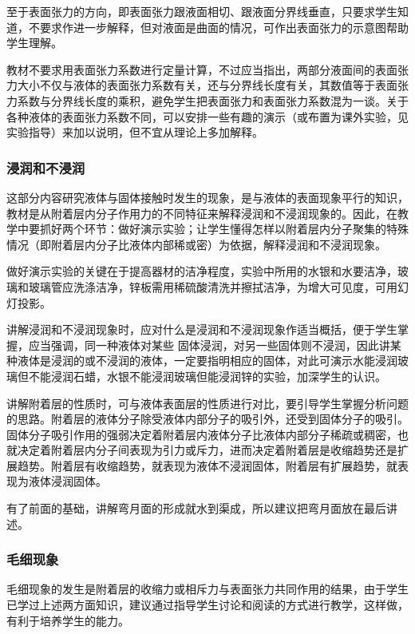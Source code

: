 至于表面张力的方向，即表面张力跟液面相切、跟液面分界线垂直，只要求学生知道，不要求作进一步解释，但对液面是曲面的情况，可作出表面张力的示意图帮助学生理解。

教材不要求用表面张力系数进行定量计算，不过应当指出，两部分液面间的表面张力大小不仅与液体的表面张力系数有关，还与分界线长度有关，其数值等于表面张力系数与分界线长度的乘积，避免学生把表面张力和表面张力系数混为一谈。关于各种液体的表面张力系数不同，可以安排一些有趣的演示（或布置为课外实验，见实验指导）来加以说明，但不宜从理论上多加解释。

\subsubsection{浸润和不浸润} 

这部分内容研究液体与固体接触时发生的现象，是与液体的表面现象平行的知识，教材是从附着层内分子作用力的不同特征来解释浸润和不浸润现象的。因此，在教学中要抓好两个环节：做好演示实验；让学生懂得怎样以附着层内分子聚集的特殊情况（即附着层内分子比液体内部稀或密）为依据，解释浸润和不浸润现象。

做好演示实验的关键在于提高器材的洁净程度，实验中所用的水银和水要洁净，玻璃和玻璃管应洗涤洁净，锌板需用稀硫酸清洗并擦拭洁净，为增大可见度，可用幻灯投影。

讲解浸润和不浸润现象时，应对什么是浸润和不浸润现象作适当概括，便于学生掌握，应当强调，同一种液体对某些
固体浸润，对另一些固体则不浸润，因此讲某种液体是浸润的或不浸润的液体，一定要指明相应的固体，对此可演示水能浸润玻璃但不能浸润石蜡，水银不能浸润玻璃但能浸润锌的实验，加深学生的认识。

讲解附着层的性质时，可与液体表面层的性质进行对比，要引导学生掌握分析问题的思路。附着层的液体分子除受液体内部分子的吸引外，还受到固体分子的吸引。固体分子吸引作用的强弱决定着附着层内液体分子比液体内部分子稀疏或稠密，也就决定着附着层内分子间表现为引力或斥力，进而决定着附着层是收缩趋势还是扩展趋势。附着层有收缩趋势，就表现为液体不浸润固体，附着层有扩展趋势，就表现为液体浸润固体。

有了前面的基础，讲解弯月面的形成就水到渠成，所以建议把弯月面放在最后讲述。

\subsubsection{毛细现象}

毛细现象的发生是附着层的收缩力或相斥力与表面张力共同作用的结果，由于学生已学过上述两方面知识，建议通过指导学生讨论和阅读的方式进行教学，这样做，有利于培养学生的能力。

